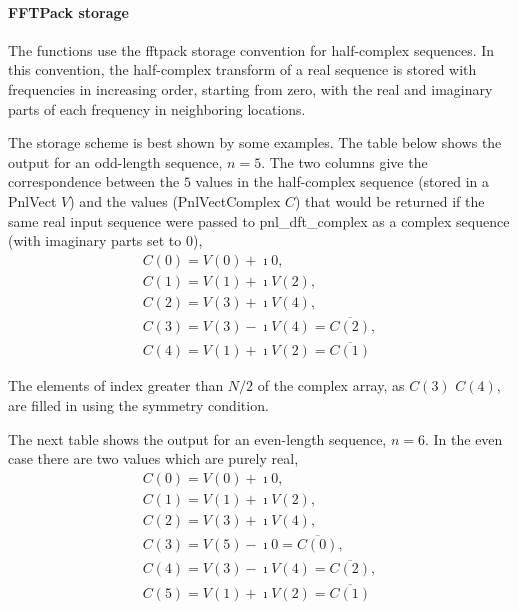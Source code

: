 \paragraph{FFTPack storage}
\label{sec:fftpack-storage}

The functions use the fftpack storage convention for half-complex sequences.
In this convention, the half-complex transform of a real sequence is stored
with frequencies in increasing order, starting from zero, with the real and
imaginary parts of each frequency in neighboring locations.

The storage scheme is best shown by some examples. The table below shows the
output for an odd-length sequence, $n=5$.  The two columns give the
correspondence between the $5$ values in the half-complex sequence (stored in
a PnlVect $V$) and the values (PnlVectComplex $C$) that would be returned if
the same real input sequence were passed to pnl_dft_complex as a complex
sequence (with imaginary parts set to 0),
\begin{equation}
  \begin{array}{l}
    C(0) =  V(0) + \imath 0, \\
    C(1) =  V(1) + \imath V(2), \\
    C(2) =  V(3) + \imath V(4), \\
    C(3) = V(3) - \imath V(4)=  \overline{C(2)} , \\
    C(4) = V(1) + \imath V(2)=  \overline{C(1)}
  \end{array}
\end{equation}

The elements of index greater than $N/2$ of the complex array, as $C(3)$
$C(4)$, are filled in using the symmetry condition.

The next table shows the output for an even-length sequence, $n=6$.
In the even case there are two values which are purely real,
\begin{equation}
  \begin{array}{l}
    C(0) =  V(0) + \imath 0, \\
    C(1) =  V(1) + \imath V(2), \\
    C(2) =  V(3) + \imath V(4), \\
    C(3) = V(5) - \imath 0    =  \overline{C(0)} , \\
    C(4) = V(3) - \imath V(4) =  \overline{C(2)} , \\
    C(5) = V(1) + \imath V(2) =  \overline{C(1)}
  \end{array}
\end{equation}


